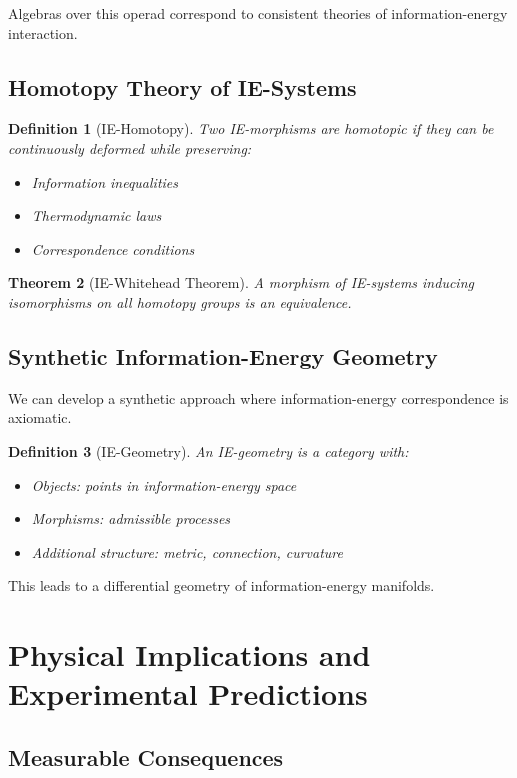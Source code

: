\documentclass[12pt]{article}
\newtheorem{theorem}{Theorem}[section]
\newtheorem{definition}[theorem]{Definition}
\begin{document}
Algebras over this operad correspond to consistent theories of information-energy interaction.

\subsection{Homotopy Theory of IE-Systems}

\begin{definition}[IE-Homotopy]
Two IE-morphisms are homotopic if they can be continuously deformed while preserving:
\begin{itemize}
\item Information inequalities
\item Thermodynamic laws
\item Correspondence conditions
\end{itemize}
\end{definition}

\begin{theorem}[IE-Whitehead Theorem]
A morphism of IE-systems inducing isomorphisms on all homotopy groups is an equivalence.
\end{theorem}

\subsection{Synthetic Information-Energy Geometry}

We can develop a synthetic approach where information-energy correspondence is axiomatic.

\begin{definition}[IE-Geometry]
An IE-geometry is a category with:
\begin{itemize}
\item Objects: points in information-energy space
\item Morphisms: admissible processes
\item Additional structure: metric, connection, curvature
\end{itemize}
\end{definition}

This leads to a differential geometry of information-energy manifolds.

\section{Physical Implications and Experimental Predictions}

\subsection{Measurable Consequences}
\end{document}
